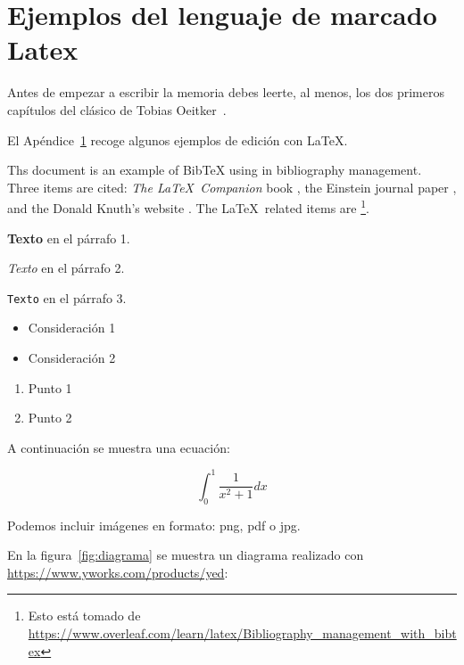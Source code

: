 \section{Ejemplos del lenguaje de marcado Latex}
\label{cap:apendice}



Antes de empezar a escribir la memoria debes leerte, al menos, los
dos primeros capítulos del clásico de Tobias
Oeitker~\cite{notsoshort}\footnotemark.


El Apéndice~\ref{cap:apendice} recoge algunos ejemplos de edición
con \LaTeX{}.

Ths document is an example of BibTeX using in bibliography management. Three items
are cited: \textit{The \LaTeX\ Companion} book \cite{latexcompanion}, the Einstein
journal paper \cite{einstein}, and the Donald Knuth's website \cite{knuthwebsite}.
The \LaTeX\ related items are \cite{latexcompanion,knuthwebsite}\footnote{Esto está tomado de
\url{https://www.overleaf.com/learn/latex/Bibliography_management_with_bibtex}}.


  \textbf{Texto} en el párrafo 1.

  \textit{Texto} en el párrafo 2.

  \texttt{Texto} en el párrafo 3.


  \begin{itemize}
  \item Consideración 1
  \item Consideración 2
  \end{itemize}

  \vspace{0.5cm}

  \begin{enumerate}
  \item Punto 1
  \item Punto 2
  \end{enumerate}

A continuación se muestra una ecuación:

  \[ \int_{0}^{1}\frac{1}{x^2+1} dx \]

  Podemos incluir imágenes en formato: png, pdf o jpg.

  En la figura~\ref{fig:diagrama} se muestra un diagrama realizado con \href{yed}{https://www.yworks.com/products/yed}:

